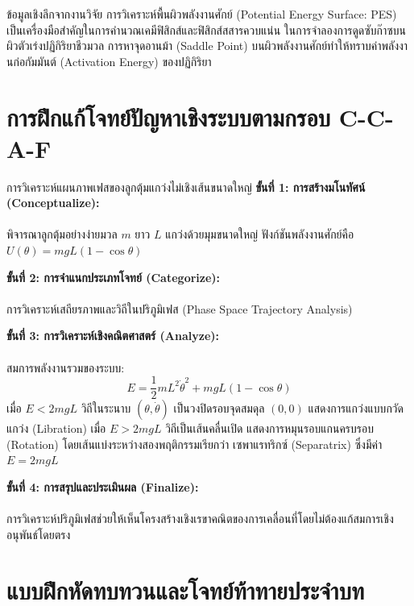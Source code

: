 \begin{researchbox}{ข้อมูลเชิงลึกจากงานวิจัย}
การวิเคราะห์พื้นผิวพลังงานศักย์ (Potential Energy Surface: PES) เป็นเครื่องมือสำคัญในการคำนวณเคมีฟิสิกส์และฟิสิกส์สสารควบแน่น ในการจำลองการดูดซับก๊าซบนผิวตัวเร่งปฏิกิริยาชีวมวล การหาจุดอานม้า (Saddle Point) บนผิวพลังงานศักย์ทำให้ทราบค่าพลังงานก่อกัมมันต์ (Activation Energy) ของปฏิกิริยา
\end{researchbox}

\section{การฝึกแก้โจทย์ปัญหาเชิงระบบตามกรอบ C-C-A-F}

\begin{ccafsolution}{การวิเคราะห์แผนภาพเฟสของลูกตุ้มแกว่งไม่เชิงเส้นขนาดใหญ่}
\textbf{ขั้นที่ 1: การสร้างมโนทัศน์ (Conceptualize):}\\\\ พิจารณาลูกตุ้มอย่างง่ายมวล $m$ ยาว $L$ แกว่งด้วยมุมขนาดใหญ่ ฟังก์ชันพลังงานศักย์คือ $U(\theta) = mgL(1 - \cos\theta)$

\vspace{4pt}
\textbf{ขั้นที่ 2: การจำแนกประเภทโจทย์ (Categorize):}\\\\ การวิเคราะห์เสถียรภาพและวิถีในปริภูมิเฟส (Phase Space Trajectory Analysis)

\vspace{4pt}
\textbf{ขั้นที่ 3: การวิเคราะห์เชิงคณิตศาสตร์ (Analyze):}\\\\ สมการพลังงานรวมของระบบ:
\begin{equation}
E = \frac{1}{2}mL^2 \dot{\theta}^2 + mgL(1 - \cos\theta)
\end{equation}
เมื่อ $E < 2mgL$ วิถีในระนาบ $(\theta, \dot{\theta})$ เป็นวงปิดรอบจุดสมดุล $(0, 0)$ แสดงการแกว่งแบบกวัดแกว่ง (Libration)
เมื่อ $E > 2mgL$ วิถีเป็นเส้นคลื่นเปิด แสดงการหมุนรอบแกนครบรอบ (Rotation) โดยเส้นแบ่งระหว่างสองพฤติกรรมเรียกว่า เซพาแรทริกซ์ (Separatrix) ซึ่งมีค่า $E = 2mgL$

\vspace{4pt}
\textbf{ขั้นที่ 4: การสรุปและประเมินผล (Finalize):}\\\\ การวิเคราะห์ปริภูมิเฟสช่วยให้เห็นโครงสร้างเชิงเรขาคณิตของการเคลื่อนที่โดยไม่ต้องแก้สมการเชิงอนุพันธ์โดยตรง
\end{ccafsolution}

\section{แบบฝึกหัดทบทวนและโจทย์ท้าทายประจำบท}

